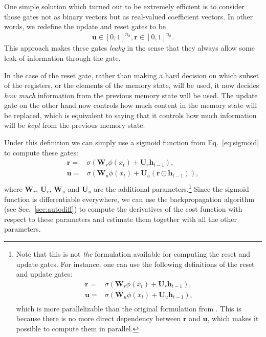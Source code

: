 \documentclass{report}
\newcommand{\vect}[1]{\mathbf{#1}}
\newcommand{\matr}[1]{\mathbf{#1}}
\newcommand{\vh}[0]{\vect{h}}
\newcommand{\vu}[0]{\vect{u}}
\newcommand{\vr}[0]{\vect{r}}
\newcommand{\mW}[0]{\matr{W}}
\newcommand{\mU}[0]{\matr{U}}
\newcommand{\sigmoid}{\sigma}
\begin{document}
One simple solution which turned out to be extremely efficient is to consider
those gates not as binary vectors but as real-valued coefficient vectors. In
other words, we redefine the update and reset gates to be
\begin{align*}
    \vu \in \left[ 0, 1 \right]^{n_h}, \vr \in \left[ 0, 1\right]^{n_h}.
\end{align*}
This approach makes these gates {\em leaky} in the sense that they always allow
some leak of information through the gate.

In the case of the reset gate, rather than making a hard decision on which
subset of the registers, or the elements of the memory state, will be used, it
now decides {\em how much} information from the previous memory state will be
used. The update gate on the other hand now controls how much content in the
memory state will be replaced, which is equivalent to saying that it controls
how much information will be {\em kept} from the previous memory state.

Under this definition we can simply use a sigmoid function from
Eq.~\eqref{eq:sigmoid} to compute these gates:
\begin{align*}
    \vr =& \sigmoid(\mW_r \phi(x_t) + \mU_r \vh_{t-1}), \\
    \vu =& \sigmoid(\mW_u \phi(x_t) + \mU_u (\vr \odot \vh_{t-1})), \\
\end{align*}
where $\mW_r$, $\mU_r$, $\mW_u$ and $\mU_u$ are the additional
parameters.\footnote{
    Note that this is not {\em the} formulation available for computing the
    reset and update gates. For instance, one can use the following definitions
    of the reset and update gates:
    \begin{align*}
        \vr =& \sigmoid(\mW_r \phi(x_t) + \mU_r \vh_{t-1}), \\
        \vu =& \sigmoid(\mW_u \phi(x_t) + \mU_u \vh_{t-1}), \\
    \end{align*}
    which is more parallelizable than the original formulation from
    \cite{Cho-et-al-EMNLP2014}. This is because there is no more direct
    dependency between $\vr$ and $\vu$, which makes it possible to compute them
    in parallel.
}
Since
the sigmoid function is differentiable everywhere, we can use the
backpropagation algorithm (see Sec.~\ref{sec:autodiff}) to compute the
derivatives of the cost function with respect to these parameters and estimate
them together with all the other parameters.
\end{document}
